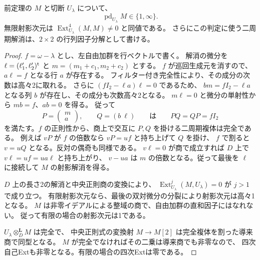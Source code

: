 \begin{proposition}\label{prop:cubic-CY-three-alpha-elliptic-line-factorization}
前定理の $M$ と切断 $U_\lambda$ について、
\[
 \operatorname{pd}_{U_\lambda} M\in\{1,\infty\}.
\]
無限射影次元は $\operatorname{Ext}^4_{U_\lambda}(M,M)\ne0$ と同値である。
さらにこの判定に使う二周期解消は、$2\times2$ の行列因子分解として書ける。
\end{proposition}
\begin{proof}
$f=\omega-\lambda$ とし、左自由加群を行ベクトルで書く。
解消の微分を $\ell=(\ell'_1,\ell'_2)^{\rm t}$ と
$m=(m_1+c_1,m_2+c_2)$ とする。
$f$ が巡回生成元を消すので、$a\ell=f$ となる行 $a$ が存在する。
フィルター付き完全性により、その成分の次数は高々2に取れる。
さらに
$(fI_2-\ell a)\ell=0$ であるため、
$b m=fI_2-\ell a$ となる列 $b$ が存在し、その成分も次数高々2となる。
$m\ell=0$ と微分の単射性から $mb=f$、$ab=0$ を得る。
従って
\[
 P=\begin{pmatrix}m\\a\end{pmatrix},\qquad Q=(b\ \ell)
 \qquad\text{は}\qquad PQ=QP=fI_2
\]
を満たす。$f$ の正則性から、商上で交互に $P,Q$ を掛ける二周期複体は完全である。
例えば $vP$ が $f$ の倍数なら $vP=u f$ と持ち上げて $Q$ を掛け、
$f$ で割ると $v=uQ$ となる。反対の偶奇も同様である。
$v\ell=0$ が商で成立すれば $D$ 上で $v\ell=uf=ua\ell$ と持ち上がり、
$v-ua$ は $m$ の倍数となる。従って最後を $\ell$ に接続して
$M$ の射影解消を得る。

$D$ 上の長さ2の解消と中央正則商の変換により、
$\operatorname{Ext}^{j}_{U_\lambda}(M,U_\lambda)=0$ が $j>1$ で成り立つ。
有限射影次元なら、最後の双対微分の分裂により射影次元は高々1となる。
$M$ は非零イデアルによる整域の商で、自由加群の直和因子にはなれない。
従って有限の場合の射影次元は1である。

$U_\lambda\otimes_D^{\mathbf L} M$ は完全で、
中央正則式の変換射 $M\to M[2]$ は完全複体を割った導来商で同型となる。
$M$ が完全でなければその二乗は導来商でも非零なので、
四次自己Extも非零となる。有限の場合の四次Extは零である。
\end{proof}

